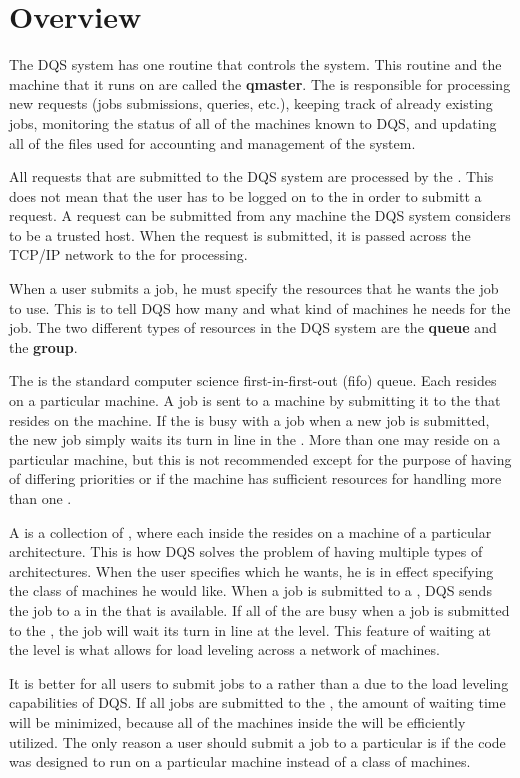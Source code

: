 \section{Overview}

The DQS system has one routine that controls the system.  This routine
and the machine that it runs on are called the {\bf qmaster}.  The
\qmaster is responsible for processing new requests (jobs submissions,
queries, etc.), keeping track of already existing jobs, monitoring the
status of all of the machines known to DQS, and updating all of the
files used for accounting and management of the system.

All requests that are submitted to the DQS system are processed by the
\qmaster.  This does not mean that the user has to be logged on to the
\qmaster in order to submitt a request.  A request can be submitted
from any machine the DQS system considers to be a trusted host.  When
the request is submitted, it is passed across the TCP/IP network to
the \qmaster for processing.

When a user submits a job, he must specify the resources that he wants
the job to use.  This is to tell DQS how many and what kind of
machines he needs for the job.  The two different types of resources
in the DQS system are the {\bf queue} and the {\bf group}.

The \queue is the standard computer science first-in-first-out (fifo)
queue.  Each \queue resides on a particular machine.  A job is sent
to a machine by submitting it to the \queue that resides on the
machine.  If the \queue is busy with a job when a new job is submitted,
the new job simply waits its turn in line in the \queue.  More than one
\queue may reside on a particular machine, but this is not recommended
except for the purpose of having \queues of differing priorities or if the
machine has sufficient resources for handling more than one \queue.

A \group is a collection of \queues, where each \queue inside the \group
resides on a machine of a particular architecture.  This is how DQS
solves the problem of having multiple types of architectures.  When
the user specifies which \group he wants, he is in effect specifying
the class of machines he would like.  When a job is submitted to a
\group, DQS sends the job to a \queue in the \group that is available.
If all of the \queues are busy when a job is submitted to the \group,
the job will wait its turn in line at the \group level.  This feature of
waiting at the \group level is what allows for load leveling across a
network of machines.

It is better for all users to submit jobs to a \group rather than a
\queue due to the load leveling capabilities of DQS.  If all jobs are
submitted to the \group, the amount of waiting time will be minimized,
because all of the machines inside the \group will be efficiently
utilized.  The only reason a user should submit a job to a
particular \queue is if the code was designed to run on a particular
machine instead of a class of machines.
